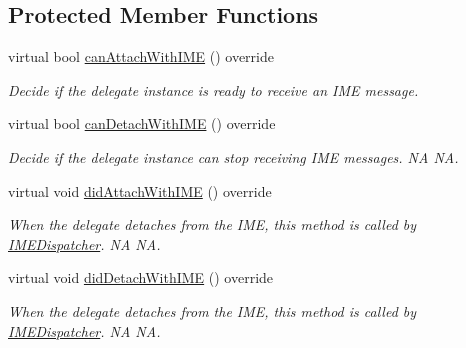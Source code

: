 \subsection*{Protected Member Functions}
\begin{DoxyCompactItemize}
\item 
virtual bool \hyperlink{classTextFieldTTF_a63d746d65aa355275274db754f49652b}{can\+Attach\+With\+I\+ME} () override
\begin{DoxyCompactList}\small\item\em Decide if the delegate instance is ready to receive an I\+ME message. \end{DoxyCompactList}\item 
\mbox{\label{classTextFieldTTF_a7097f8aa9b2ddd7749817958f9192a1a}} 
virtual bool \hyperlink{classTextFieldTTF_a7097f8aa9b2ddd7749817958f9192a1a}{can\+Detach\+With\+I\+ME} () override
\begin{DoxyCompactList}\small\item\em Decide if the delegate instance can stop receiving I\+ME messages.  NA  NA. \end{DoxyCompactList}\item 
\mbox{\label{classTextFieldTTF_a9f0b7178da8e685ba2fc9e0c4d73fbae}} 
virtual void \hyperlink{classTextFieldTTF_a9f0b7178da8e685ba2fc9e0c4d73fbae}{did\+Attach\+With\+I\+ME} () override
\begin{DoxyCompactList}\small\item\em When the delegate detaches from the I\+ME, this method is called by \hyperlink{classIMEDispatcher}{I\+M\+E\+Dispatcher}.  NA  NA. \end{DoxyCompactList}\item 
\mbox{\label{classTextFieldTTF_abbd1714064d9c2f55fe7e966c9345385}} 
virtual void \hyperlink{classTextFieldTTF_abbd1714064d9c2f55fe7e966c9345385}{did\+Detach\+With\+I\+ME} () override
\begin{DoxyCompactList}\small\item\em When the delegate detaches from the I\+ME, this method is called by \hyperlink{classIMEDispatcher}{I\+M\+E\+Dispatcher}.  NA  NA. \end{DoxyCompactList}\item 
\mbox{\label{classTextFieldTTF_a4e56aeb374dfa1fae2191636fd97da95}} 

\end{DoxyCompactItemize}
